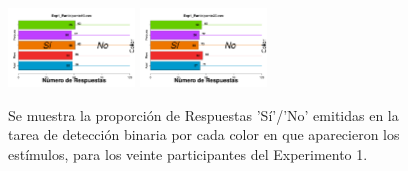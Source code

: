 \begin{figure}[th]
\includegraphics[width=0.30\textwidth]{Figures/BiasColor_Exp1_P19} \includegraphics[width=0.30\textwidth]{Figures/BiasColor_Exp1_P20} 
\caption[Proporción de Respuestas Sí/No por Color; Experimento 1]{Se muestra la proporción de Respuestas 'Sí'/'No' emitidas en la tarea de detección binaria por cada color en que aparecieron los estímulos, para los veinte participantes del Experimento 1.}
\label{fig:BiasCol_E1}
\end{figure}

